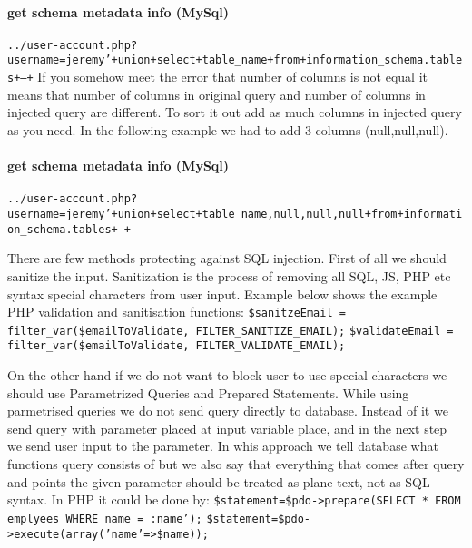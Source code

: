 \documentclass{article}[12pt]
\newcommand{\q}[1]{\texttt{#1}}
\begin{document}
\paragraph{get schema metadata info (MySql)} \q{../user-account.php?username=jeremy'+union+select+table\_name+from+information\_schema.tables+--+}
If you somehow meet the error that number of columns is not equal it means that number of columns in original query and number of columns in injected query are different.
To sort it out add as much columns in injected query as you need.
In the following example we had to add 3 columns (null,null,null).
\paragraph{get schema metadata info (MySql)} \q{../user-account.php?username=jeremy'+union+select+table\_name,null,null,null+from+information\_schema.tables+--+}

There are few methods protecting against SQL injection.
First of all we should sanitize the input.
Sanitization is the process of removing all SQL, JS, PHP etc syntax special characters from user input.
Example below shows the example PHP validation and sanitisation functions:
\newline
\newline
\texttt{\$sanitzeEmail = filter\_var(\$emailToValidate, FILTER\_SANITIZE\_EMAIL);}
\newline
\texttt{\$validateEmail = filter\_var(\$emailToValidate, FILTER\_VALIDATE\_EMAIL);}
\newline

On the other hand if we do not want to block user to use special characters we should use Parametrized Queries and Prepared Statements.
While using parmetrised queries we do not send query directly to database.
Instead of it we send query with parameter placed at input variable place, and in the next step we send user input to the parameter.
In whis approach we tell database what functions query consists of but we also say that everything that comes after query and points the given parameter should be treated as plane text, not as SQL syntax.
In PHP it could be done by:
\newline
\newline
\texttt{\$statement=\$pdo->prepare(SELECT * FROM emplyees WHERE name = :name');}
\newline
\texttt{\$statement=\$pdo->execute(array('name'=>\$name));}
\newline
\end{document}
